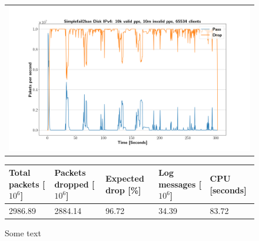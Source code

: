 \begin{figure}[p]
	\label{fig:simplefail2ban:disk:ip4:10m}
	\centering
	\scriptsize
	\begin{tabular}{c}
    	\centerline{\includegraphics[width=1.2\textwidth]{images/simplefail2ban_disk_ipv4_v10k_iv10m_c65534.png}}
	\end{tabular}
	\begin{tabular}{lllll}
		\toprule
		\textbf{Total packets [$10^6$]} & \textbf{Packets dropped [$10^6$]} & \textbf{Expected drop [\%]} & \textbf{Log messages [$10^6$]} & \textbf{CPU [seconds]} \\ \midrule 
		2986.89 & 2884.14 & 96.72 & 34.39 & 83.72 \\
		\bottomrule
	\end{tabular}
	\caption[Simplefail2ban Logfile IPv4 10m PPS]{Some text}
\end{figure}

